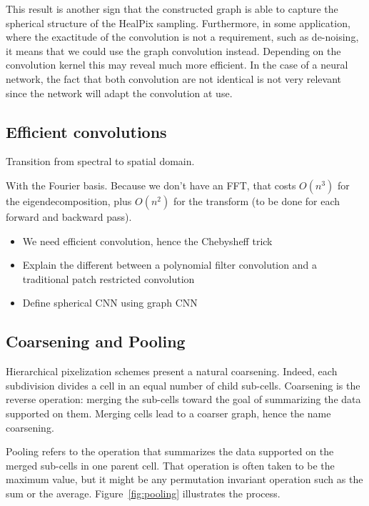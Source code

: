\documentclass[final,twocolumn,3p,times,authoryear]{elsarticle}
\newcommand{\assign}[1]{{\color[rgb]{.8,.5,.8}{Assigned: #1 }}}
\newcommand{\figref}[1]{Figure~\ref{fig:#1}}
\newcommand{\1}{\b{1}}              %
\newcommand{\0}{\b{0}}              %
\begin{document}
This result is another sign that the constructed graph is able to capture the spherical
structure of the HealPix sampling. Furthermore, in some application, where the
exactitude of the convolution is not a requirement, such as de-noising, it means
that we could use the graph convolution instead. Depending on the convolution kernel
this may reveal much more efficient. In the case of a neural network, the fact
that both convolution are not identical is not very relevant since the network
will adapt the convolution at use.


\subsection{Efficient convolutions}
\label{sec:efficient_convolution}
\assign{Michaël}

Transition from spectral to spatial domain.

With the Fourier basis. Because we don't have an FFT, that costs $O(n^3)$ for the eigendecomposition, plus $O(n^2)$ for the transform (to be done for each forward and backward pass).
\begin{itemize}
	\item We need efficient convolution, hence the Chebysheff trick
	\item Explain the different between a polynomial filter convolution and a traditional patch restricted convolution
	\item Define spherical CNN using graph CNN
\end{itemize}

\subsection{Coarsening and Pooling}

Hierarchical pixelization schemes present a natural coarsening. Indeed, each subdivision divides a cell in an equal number of child sub-cells. Coarsening is the reverse operation: merging the sub-cells toward the goal of summarizing the data supported on them. Merging cells lead to a coarser graph, hence the name coarsening.

Pooling refers to the operation that summarizes the data supported on the merged sub-cells in one parent cell. That operation is often taken to be the maximum value, but it might be any permutation invariant operation such as the sum or the average. \figref{pooling} illustrates the process.

\end{document}
